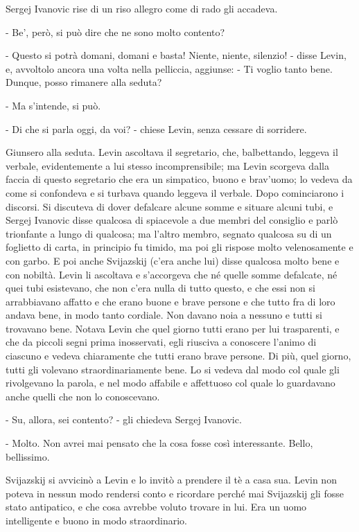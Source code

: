 Sergej Ivanovic rise di un riso allegro come di rado gli accadeva. 

- Be', però, si può dire che ne sono molto contento? 

- Questo si potrà domani, domani e basta! Niente, niente, silenzio! - disse Levin, e, avvoltolo ancora una volta nella pelliccia, aggiunse: - Ti voglio tanto bene. Dunque, posso rimanere alla seduta? 

- Ma s'intende, si può. 

- Di che si parla oggi, da voi? - chiese Levin, senza cessare di sorridere. 

Giunsero alla seduta. Levin ascoltava il segretario, che, balbettando, leggeva il verbale, evidentemente a lui stesso incomprensibile; ma Levin scorgeva dalla faccia di questo segretario che era un simpatico, buono e brav'uomo; lo vedeva da come si confondeva e si turbava quando leggeva il verbale. Dopo cominciarono i discorsi. Si discuteva di dover defalcare alcune somme e situare alcuni tubi, e Sergej Ivanovic disse qualcosa di spiacevole a due membri del consiglio e parlò trionfante a lungo di qualcosa; ma l'altro membro, segnato qualcosa su di un foglietto di carta, in principio fu timido, ma poi gli rispose molto velenosamente e con garbo. E poi anche Svijazskij (c'era anche lui) disse qualcosa molto bene e con nobiltà. Levin li ascoltava e s'accorgeva che né quelle somme defalcate, né quei tubi esistevano, che non c'era nulla di tutto questo, e che essi non si arrabbiavano affatto e che erano buone e brave persone e che tutto fra di loro andava bene, in modo tanto cordiale. Non davano noia a nessuno e tutti si trovavano bene. Notava Levin che quel giorno tutti erano per lui trasparenti, e che da piccoli segni prima inosservati, egli riusciva a conoscere l'animo di ciascuno e vedeva chiaramente che tutti erano brave persone. Di più, quel giorno, tutti gli volevano straordinariamente bene. Lo si vedeva dal modo col quale gli rivolgevano la parola, e nel modo affabile e affettuoso col quale lo guardavano anche quelli che non lo conoscevano. 

- Su, allora, sei contento? - gli chiedeva Sergej Ivanovic. 

- Molto. Non avrei mai pensato che la cosa fosse così interessante. Bello, bellissimo. 

Svijazskij si avvicinò a Levin e lo invitò a prendere il tè a casa sua. Levin non poteva in nessun modo rendersi conto e ricordare perché mai Svijazskij gli fosse stato antipatico, e che cosa avrebbe voluto trovare in lui. Era un uomo intelligente e buono in modo straordinario. 

